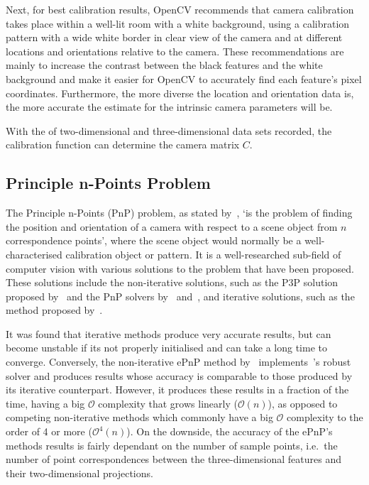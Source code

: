 Next, for best calibration results, OpenCV recommends that camera calibration takes place within a well-lit room with a white background, using a calibration pattern with a wide white border in clear view of the camera and at different locations and orientations relative to the camera. These recommendations are mainly to increase the contrast between the black features and the white background and make it easier for OpenCV to accurately find each feature's pixel coordinates. Furthermore, the more diverse the location and orientation data is, the more accurate the estimate for the intrinsic camera parameters will be. 

With the of two-dimensional and three-dimensional data sets recorded, the calibration function can determine the camera matrix $C$. 

\subsection{Principle n-Points Problem}

The Principle n-Points (PnP) problem, as stated by~\cite{horaud1989analytic}, `is the problem of finding the position and orientation of a camera with respect to a scene object from $n$ correspondence points', where the scene object would normally be a well-characterised calibration object or pattern. It is a well-researched sub-field of computer vision with various solutions to the problem that have been proposed. These solutions include the non-iterative solutions, such as the P3P solution proposed by~\cite{gao2003complete} and the PnP solvers by~\cite{lepetit2009epnp} and~\cite{schweighofer2006robust}, and iterative solutions, such as the method proposed by~\cite{lu2000fast}.

It was found that iterative methods produce very accurate results, but can become unstable if its not properly initialised and can take a long time to converge. Conversely, the non-iterative ePnP method by~\citeauthor{lepetit2009epnp} implements~\citeauthor{schweighofer2006robust}'s robust solver and produces results whose accuracy is comparable to those produced by its iterative counterpart. However, it produces these results in a fraction of the time, having a big $\mathcal{O}$ complexity that grows linearly ($\mathcal{O}(n)$), as opposed to competing non-iterative methods which commonly have a big $\mathcal{O}$ complexity to the order of 4 or more ($\mathcal{O}^4(n)$). On the downside, the accuracy of the ePnP's methods results is fairly dependant on the number of sample points, i.e.\ the number of point correspondences between the three-dimensional features and their two-dimensional projections. 


